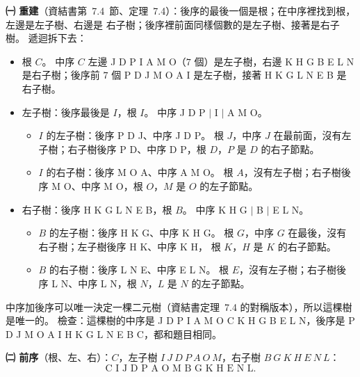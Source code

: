 \begin{pastsoln}
\textbf{㈠ 重建}（資結書第~7.4~節、定理~7.4）：後序的最後一個是根；在中序裡找到根，左邊是左子樹、右邊是
右子樹；後序裡前面同樣個數的是左子樹、接著是右子樹。 遞迴拆下去：
\begin{itemize}
\item 根 $C$。 中序 $C$ 左邊 J D P I A M O（$7$ 個）是左子樹，右邊 K H G B E L N 是右子樹；後序前 $7$ 個
P D J M O A I 是左子樹，接著 H K G L N E B 是右子樹。
\item 左子樹：後序最後是 $I$，根 $I$。 中序 J D P $\mid$ I $\mid$ A M O。
\begin{itemize}
\item $I$ 的左子樹：後序 P D J、中序 J D P。 根 $J$，中序 $J$ 在最前面，沒有左子樹；右子樹後序 P D、中序
D P，根 $D$，$P$ 是 $D$ 的右子節點。
\item $I$ 的右子樹：後序 M O A、中序 A M O。 根 $A$，沒有左子樹；右子樹後序 M O、中序 M O，根 $O$，$M$ 是
$O$ 的左子節點。
\end{itemize}
\item 右子樹：後序 H K G L N E B，根 $B$。 中序 K H G $\mid$ B $\mid$ E L N。
\begin{itemize}
\item $B$ 的左子樹：後序 H K G、中序 K H G。 根 $G$，中序 $G$ 在最後，沒有右子樹；左子樹後序 H K、中序 K H，
根 $K$，$H$ 是 $K$ 的右子節點。
\item $B$ 的右子樹：後序 L N E、中序 E L N。 根 $E$，沒有左子樹；右子樹後序 L N、中序 L N，根 $N$，$L$ 是
$N$ 的左子節點。
\end{itemize}
\end{itemize}
\begin{center}
\end{center}
中序加後序可以唯一決定一棵二元樹（資結書定理~7.4 的對稱版本），所以這棵樹是唯一的。 檢查：這棵樹的中序是
J D P I A M O C K H G B E L N，後序是 P D J M O A I H K G L N E B C，都和題目相同。

\textbf{㈡ 前序}（根、左、右）：$C$，左子樹 $I\ J\ D\ P\ A\ O\ M$，右子樹 $B\ G\ K\ H\ E\ N\ L$：
\[
\text{C I J D P A O M B G K H E N L}.
\]
\end{pastsoln}
